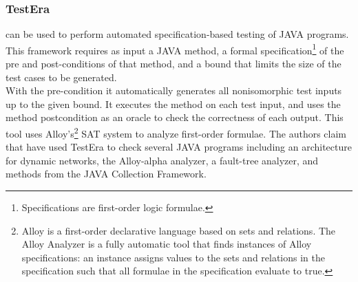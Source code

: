 \documentclass[10pt, conference, compsocconf]{IEEEtran}
\begin{document}

\subsubsection{\textbf{TestEra}\cite{testera}}
can be used to perform automated specification-based testing of
JAVA programs. This framework requires as input a JAVA method, a formal specification\footnote{Specifications are first-order logic formulae.}
of the pre and post-conditions of that method, and a bound that limits the size of the test cases to be generated.\\
With the pre-condition it automatically generates all nonisomorphic test inputs up to the given bound.
It executes the method on each test input, and uses the method postcondition as an oracle to check the correctness of each output. This tool
uses Alloy's\footnote{Alloy is a first-order declarative language based on sets and relations. The Alloy Analyzer is a fully
automatic tool that finds instances of Alloy specifications: an instance
assigns values to the sets and relations in the specification such that
all formulae in the specification evaluate to true.} SAT system to analyze first-order  formulae.
The authors claim that have used TestEra to check several JAVA programs including an architecture for
dynamic networks, the Alloy-alpha analyzer, a fault-tree analyzer, and methods from the JAVA Collection Framework.
\end{document}
